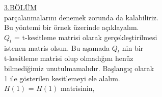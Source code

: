 \documentclass[11pt]{amsbook}
\begin{document}
 \underline{3.B\"{O}L\"{U}M  \hspace{6cm}}\\
\linebreak{}
par\c{c}alanmalar{\i}n{\i} denemek zorunda da kalabiliriz.\\
Bu y\"{o}ntemi bir \"{o}rnek \"{u}zerinde a\c{c}{\i}klayal{\i}m.\\

$Q_t$ = 
\linebreak{}
t-kesitleme matrisi olarak ger\c{c}ekleştirilmesi\\
istenen matris olsun. Bu a\c{s}amada $Q_t$ nin bir\\
t-kesitleme matrisi olup olmad{\i}\u{g}{\i}n{\i} hen\"{u}z\\
bilmedi\u{g}imiz unutulmamal{\i}d{\i}r. Ba\c{s}lang{\i}\c{c} olarak\\
1 ile g\"{o}sterilen kesitlemeyi ele alal{\i}m. \\
$H(1)$ = 
\linebreak{}
$H(1)$ matrisinin,
\end{document}
